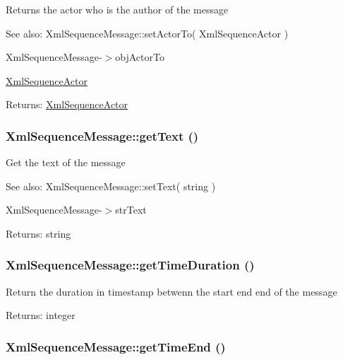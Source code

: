 Returns the actor who is the author of the message

\begin{Desc}
\item[See also:]XmlSequenceMessage::setActorTo( XmlSequenceActor ) 

XmlSequenceMessage-$>$objActorTo 

\hyperlink{class_xml_sequence_actor}{XmlSequenceActor} \end{Desc}
\begin{Desc}
\item[Returns:]\hyperlink{class_xml_sequence_actor}{XmlSequenceActor} \end{Desc}
\hypertarget{class_xml_sequence_message_1f80c7d126fc2183c3c99a71df3f1d20}{
\subsubsection[{getText}]{\setlength{\rightskip}{0pt plus 5cm}XmlSequenceMessage::getText ()}}
\label{class_xml_sequence_message_1f80c7d126fc2183c3c99a71df3f1d20}


Get the text of the message

\begin{Desc}
\item[See also:]XmlSequenceMessage::setText( string ) 

XmlSequenceMessage-$>$strText \end{Desc}
\begin{Desc}
\item[Returns:]string \end{Desc}
\hypertarget{class_xml_sequence_message_0f7538c36a98475fcd35cd554e7c7d05}{
\subsubsection[{getTimeDuration}]{\setlength{\rightskip}{0pt plus 5cm}XmlSequenceMessage::getTimeDuration ()}}
\label{class_xml_sequence_message_0f7538c36a98475fcd35cd554e7c7d05}


Return the duration in timestamp betwenn the start end end of the message

\begin{Desc}
\item[Returns:]integer \end{Desc}
\hypertarget{class_xml_sequence_message_a0c32ce53d9ecdff7099c221126fb58c}{
\subsubsection[{getTimeEnd}]{\setlength{\rightskip}{0pt plus 5cm}XmlSequenceMessage::getTimeEnd ()}}
\label{class_xml_sequence_message_a0c32ce53d9ecdff7099c221126fb58c}


